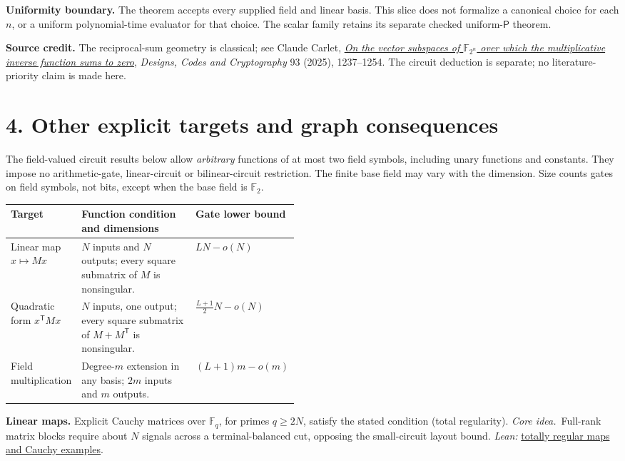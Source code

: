 \documentclass[11pt]{article}
\providecommand{\RepoRoot}{../../}
\newcommand{\repolink}[2]{\href{\RepoRoot#1}{#2}}
\newcommand{\leanlink}[2]{\repolink{Complexitylib/Algebraic/LowerBound/Cutwidth/#1}{#2}}
\newcommand{\method}{\textit{Core idea.}\ }
\newcommand{\little}[1]{o(#1)}
\begin{document}
\textbf{Uniformity boundary.}
The theorem accepts every supplied field and linear basis. This slice does not
formalize a canonical choice for each $n$, or a uniform polynomial-time evaluator
for that choice. The scalar family retains its separate checked uniform-$\mathsf P$
theorem.

\textbf{Source credit.}
The reciprocal-sum geometry is classical; see Claude Carlet,
\href{https://doi.org/10.1007/s10623-024-01531-6}{\emph{On the vector subspaces of
$\mathbb F_{2^n}$ over which the multiplicative inverse function sums to zero}},
\emph{Designs, Codes and Cryptography} 93 (2025), 1237--1254.
The circuit deduction is separate; no literature-priority claim is made here.

\newpage
\section*{4. Other explicit targets and graph consequences}

The field-valued circuit results below allow \emph{arbitrary} functions of at
most two field symbols, including unary functions and constants. They impose no
arithmetic-gate, linear-circuit or bilinear-circuit restriction. The finite base
field may vary with the dimension. Size counts gates on field symbols, not bits,
except when the base field is $\mathbb F_2$.

\begin{tabularx}{\linewidth}{@{}p{0.22\linewidth}Yp{0.25\linewidth}@{}}
\toprule
Target & Function condition and dimensions & Gate lower bound \\
\midrule
Linear map $x\mapsto Mx$
  & $N$ inputs and $N$ outputs; every square submatrix of $M$ is nonsingular.
  & $LN-\little N$ \\[5pt]
Quadratic form $x^{\mathsf T}Mx$
  & $N$ inputs, one output; every square submatrix of $M+M^{\mathsf T}$ is nonsingular.
  & $\frac{L+1}{2}N-\little N$ \\[5pt]
Field multiplication
  & Degree-$m$ extension in any basis; $2m$ inputs and $m$ outputs.
  & $(L+1)m-\little m$ \\
\bottomrule
\end{tabularx}

\textbf{Linear maps.} Explicit Cauchy matrices over $\mathbb F_q$, for primes
$q\geq2N$, satisfy the stated condition (total regularity).
\method Full-rank matrix blocks require about $N$ signals across a
terminal-balanced cut, opposing the small-circuit layout bound.
\textit{Lean:} \leanlink{MultiOutput/TotallyRegular.lean}{totally regular maps and Cauchy examples}.
\end{document}
